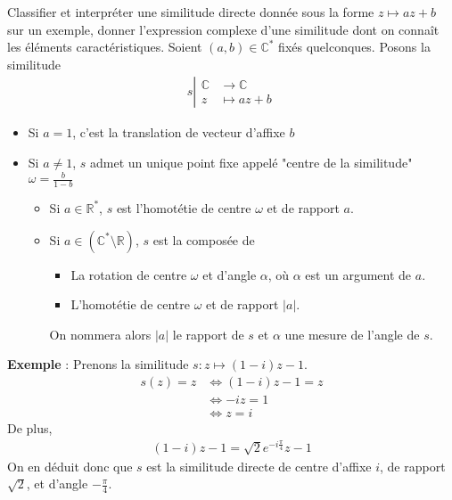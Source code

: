 \documentclass{article}
\begin{document}
\begin{question_kholle}{Classifier et interpréter une similitude directe donnée sous la forme $z \mapsto a z + b$ sur un exemple, donner l'expression complexe d'une similitude dont on connaît les éléments caractéristiques.}
	Soient $(a, b) \in \mathbb{C}^*$ fixés quelconques. Posons la similitude
	\begin{align*}
		s \left| \begin{array}{ll}
			\mathbb{C} &\to \mathbb{C} \\
			z &\mapsto a z + b
		\end{array}\right.
	\end{align*}
	\begin{itemize}[label=$\lozenge$]
		\item Si $a = 1$, c'est la translation de vecteur d'affixe $b$
		\item Si $a \neq 1$, $s$ admet un unique point fixe appelé "centre de la similitude" $\omega = \frac{b}{1-b}$
		\begin{itemize}[label=$\star$]
			\item Si $a \in \mathbb{R}^*$, $s$ est l'homotétie de centre $\omega$ et de rapport $a$.
			\item Si $a \in (\mathbb{C}^* \setminus \mathbb{R})$, $s$ est la composée de
			\begin{itemize}
				\item La rotation de centre $\omega$ et d'angle $\alpha$, où $\alpha$ est un argument de $a$.
				\item L'homotétie de centre $\omega$ et de rapport $|a|$. 
			\end{itemize}
			On nommera alors $|a|$ le rapport de $s$ et $\alpha$ une mesure de l'angle de $s$.
		\end{itemize}
	\end{itemize}
	\textbf{Exemple} : Prenons la similitude $s: z \mapsto (1 - i) z - 1$.
	\begin{align*}
		s(z) = z &\iff (1 - i)z - 1 = z\\
		&\iff -iz = 1\\
		&\iff z = i
	\end{align*}
	De plus,
	\begin{align*}
		(1 - i)z - 1 = \sqrt{2}e^{-i \frac{\pi}{4}}z - 1
	\end{align*}
	On en déduit donc que $s$ est la similitude directe de centre d'affixe $i$, de rapport $\sqrt{2}$, et d'angle $-\frac{\pi}{4}$.
\end{question_kholle}
\end{document}
